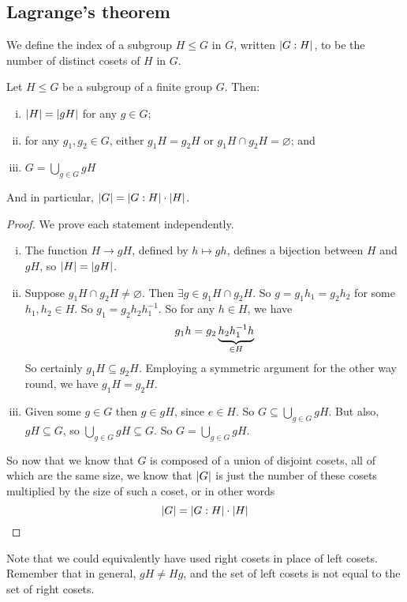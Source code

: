 \subsection{Lagrange's theorem}
\begin{definition}
	We define the index of a subgroup \(H \leq G\) in \(G\), written \(\abs{G : H}\), to be the number of distinct cosets of \(H\) in \(G\).
\end{definition}
\begin{theorem}
	Let \(H \leq G\) be a subgroup of a finite group \(G\).
	Then:
	\begin{enumerate}[(i)]
		\item \(\abs{H} = \abs{gH}\) for any \(g \in G\);
		\item for any \(g_1, g_2 \in G\), either \(g_1 H = g_2 H\) or \(g_1 H \cap g_2 H = \varnothing\); and
		\item \(G = \bigcup_{g \in G} gH\)
	\end{enumerate}
	And in particular, \(\abs{G} = \abs{G : H} \cdot \abs{H}\).
\end{theorem}
\begin{proof}
	We prove each statement independently.
	\begin{enumerate}[(i)]
		\item The function \(H \to gH\), defined by \(h \mapsto gh\), defines a bijection between \(H\) and \(gH\), so \(\abs{H} = \abs{gH}\).
		\item Suppose \(g_1 H \cap g_2 H \neq \varnothing\).
		      Then \(\exists g \in g_1 H \cap g_2 H\).
		      So \(g = g_1 h_1 = g_2 h_2\) for some \(h_1, h_2 \in H\).
		      So \(g_1 = g_2 h_2 h_1^{-1}\).
		      So for any \(h \in H\), we have
		      \[
			      g_1 h = g_2 \underbrace{h_2 h_1^{-1} h}_{\mathclap{\in H}}
		      \]
		      So certainly \(g_1 H \subseteq g_2 H\).
		      Employing a symmetric argument for the other way round, we have \(g_1 H = g_2 H\).
		\item Given some \(g \in G\) then \(g \in gH\), since \(e \in H\).
		      So \(G \subseteq \bigcup_{g \in G} gH\).
		      But also, \(gH \subseteq G\), so \(\bigcup_{g \in G} gH \subseteq G\).
		      So \(G = \bigcup_{g \in G} gH\).
	\end{enumerate}
	So now that we know that \(G\) is composed of a union of disjoint cosets, all of which are the same size, we know that \(\abs{G}\) is just the number of these cosets multiplied by the size of such a coset, or in other words
	\[
		\abs{G} = \abs{G : H} \cdot \abs{H}
	\]
\end{proof}
Note that we could equivalently have used right cosets in place of left cosets.
Remember that in general, \(gH \neq Hg\), and the set of left cosets is not equal to the set of right cosets.

